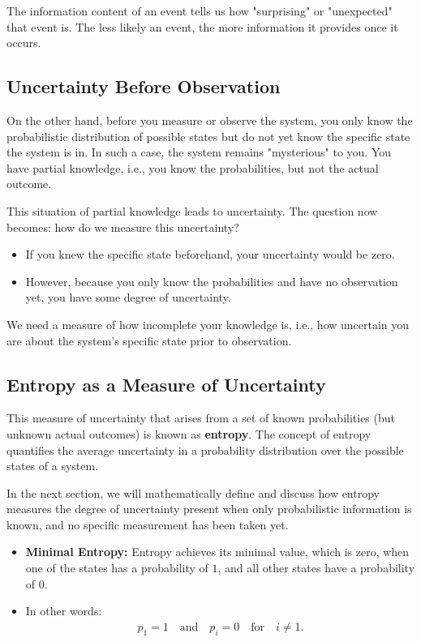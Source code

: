 \documentclass[12pt,a4paper]{article}
\newenvironment{rembox}[1][]{%
  \begin{tcolorbox}[enhanced, breakable, colback=gray!5, colframe=gray!50, title=#1, fonttitle=\bfseries, arc=3pt, boxrule=0.5pt]
}{\end{tcolorbox}}
\begin{document}
\begin{rembox}[Understanding Information]
The information content of an event tells us how "surprising" or "unexpected" that event is. The less likely an event, the more information it provides once it occurs.
\end{rembox}

\subsection{Uncertainty Before Observation}

On the other hand, before you measure or observe the system, you only know the probabilistic distribution of possible states but do not yet know the specific state the system is in. In such a case, the system remains "mysterious" to you. You have partial knowledge, i.e., you know the probabilities, but not the actual outcome.

This situation of partial knowledge leads to uncertainty. The question now becomes: how do we measure this uncertainty?

\begin{itemize}
    \item If you knew the specific state beforehand, your uncertainty would be zero.
    \item However, because you only know the probabilities and have no observation yet, you have some degree of uncertainty.
\end{itemize}

\begin{rembox}[Uncertainty as a Measure]
We need a measure of how incomplete your knowledge is, i.e., how uncertain you are about the system’s specific state prior to observation.
\end{rembox}

\subsection{Entropy as a Measure of Uncertainty}

This measure of uncertainty that arises from a set of known probabilities (but unknown actual outcomes) is known as \textbf{entropy}. The concept of entropy quantifies the average uncertainty in a probability distribution over the possible states of a system.

In the next section, we will mathematically define and discuss how entropy measures the degree of uncertainty present when only probabilistic information is known, and no specific measurement has been taken yet.
\begin{itemize}
    \item \textbf{Minimal Entropy:} Entropy achieves its minimal value, which is zero, when one of the states has a probability of $1$, and all other states have a probability of $0$.
    \item In other words:
        \begin{align*}
            p_1 = 1 \quad \text{and} \quad p_i = 0 \quad \text{for} \quad i \neq 1.
        \end{align*}
\end{itemize}
\end{document}
